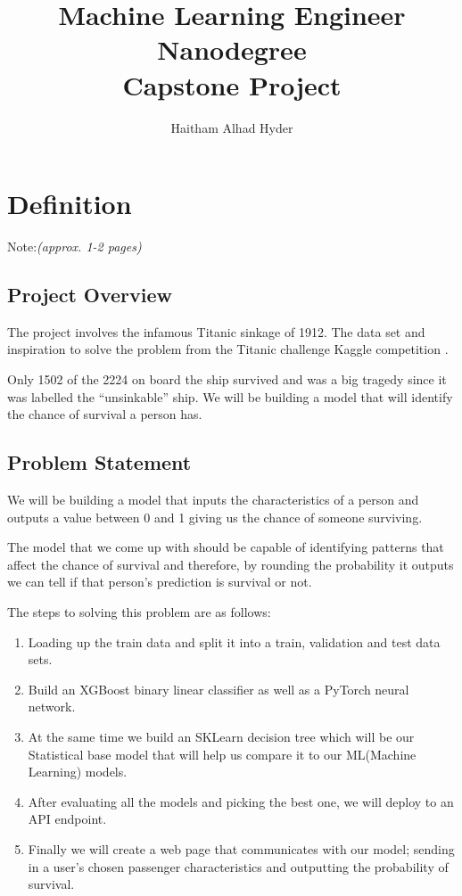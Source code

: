 \documentclass{article}
\title{Machine Learning Engineer Nanodegree \\
\large Capstone Project}
\author{Haitham Alhad Hyder}
\begin{document}
\maketitle

\section{Definition}\label{definition}

Note:\emph{(approx. 1-2 pages)}

\subsection*{Project Overview}\label{project-overview}

The project involves the infamous Titanic sinkage of 1912. The data set
and inspiration to solve the problem from the Titanic challenge
Kaggle competition \parencite{kaggle}.

Only 1502 of the 2224 on board the ship survived and was a big tragedy
since it was labelled the ``unsinkable'' ship. We will be building a
model that will identify the chance of survival a person has.

\subsection{Problem Statement}\label{problem-statement}

We will be building a model that inputs the characteristics of a person
and outputs a value between 0 and 1 giving us the chance of someone
surviving.

The model that we come up with should be capable of identifying patterns
that affect the chance of survival and therefore, by rounding the
probability it outputs we can tell if that person's prediction is
survival or not.

The steps to solving this problem are as follows:

\begin{enumerate}
\item
  Loading up the train data and split it into a train, validation and
  test data sets.
\item
  Build an XGBoost binary linear classifier as well as a PyTorch neural
  network.
\item
  At the same time we build an SKLearn decision tree which will be our
  Statistical base model that will help us compare it to our ML(Machine
  Learning) models.
\item
  After evaluating all the models and picking the best one, we will
  deploy to an API endpoint.
\item
  Finally we will create a web page that communicates with our model;
  sending in a user's chosen passenger characteristics and outputting
  the probability of survival.
\end{enumerate}
\end{document}
